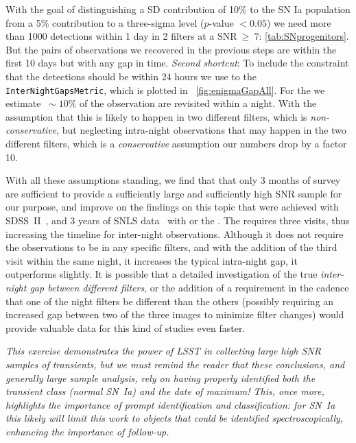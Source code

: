 With the goal of distinguishing a SD contribution of 10\% to the SN Ia
population from a 5\% contribution to a three-sigma level ($p$-value $<0.05$)  we need more
than 1000 detections within 1 day in 2 filters at a
$\mathrm{SNR}~\geq~7$: \autoref{tab:SNprogenitors}. But the pairs
of observations we recovered in the previous steps are within the first
10 days but with any gap in time. \emph{Second shortcut}: To include
the constraint that the detections should be within 24 hours we use
to the \texttt{InterNightGapsMetric}, which is plotted in
~\autoref{fig:enigmaGapAll}.  For the  we
estimate $~\sim10\%$ of the observation are revisited within a
night. With the assumption that this is likely to happen in two
different filters, which is \emph{non-conservative}, but neglecting
intra-night observations that may happen in the two different filters,
which is a \emph{conservative} assumption our numbers drop by a factor
10.

With all these assumptions standing, we find that that only 3 months
of survey are sufficient to provide a sufficiently large and
sufficiently high SNR sample for our purpose, and improve on the
findings on this topic that were achieved with
SDSS~II~\citep{Hayden2010}, and 3 years of SNLS data~\citep{Bianco11}
with  or the
. The
 requires three visits, thus
increasing the timeline for inter-night observations. Although it does not
require the observations to be in any specific filters, and with the
addition of the third visit within the same night, it increases the
typical intra-night gap, it outperforms  slightly.
It is possible that a detailed investigation
of the true \emph{inter-night gap between different filters}, or the
addition of a requirement in the cadence that one of the night filters
be different than the others (possibly requiring an increased gap
between two of the three images to minimize filter changes) would
provide valuable data for this kind of studies even faster.

\emph{This exercise demonstrates the power of LSST in collecting large high SNR samples of transients, but we must remind the reader that these conclusions, and generally large sample analysis, rely on having properly identified both the transient class (normal SN~Ia) and the date of maximum! This, once more, highlights the importance of prompt identification and classification: for SN~Ia this likely will limit this work to objects that could be identified spectroscopically, enhancing the importance of follow-up.}


